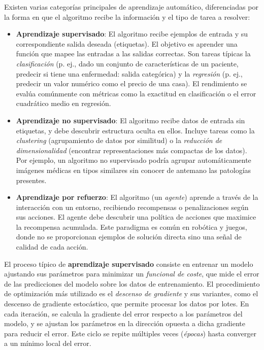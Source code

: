 \documentclass[11pt,spanish,listoffigures,listoftables]{tfgetsinf}
\begin{document}
Existen varias categorías principales de aprendizaje automático, diferenciadas por la forma en que el algoritmo recibe la información 
y el tipo de tarea a resolver:
\begin{itemize}
    \item \textbf{Aprendizaje supervisado}: El algoritmo recibe ejemplos de entrada y su correspondiente salida deseada (etiquetas). 
    El objetivo es aprender una función que mapee las entradas a las salidas correctas. Son tareas típicas la \textit{clasificación} 
    (p. ej., dado un conjunto de características de un paciente, predecir si tiene una enfermedad: salida categórica) y la 
    \textit{regresión} (p. ej., predecir un valor numérico como el precio de una casa). El rendimiento se evalúa comúnmente con métricas
    como la exactitud en clasificación o el error cuadrático medio en regresión.

    \item \textbf{Aprendizaje no supervisado}: El algoritmo recibe datos de entrada sin etiquetas, y debe descubrir estructura oculta en 
    ellos. Incluye tareas como la \textit{clustering} (agrupamiento de datos por similitud) o la \textit{reducción de dimensionalidad} 
    (encontrar representaciones más compactas de los datos). Por ejemplo, un algoritmo no supervisado podría agrupar automáticamente 
    imágenes médicas en tipos similares sin conocer de antemano las patologías presentes.
    
    \item \textbf{Aprendizaje por refuerzo}: El algoritmo (un \textit{agente}) aprende a través de la interacción con un entorno, 
    recibiendo recompensas o penalizaciones según sus acciones. El agente debe descubrir una política de acciones que maximice la 
    recompensa acumulada. Este paradigma es común en robótica y juegos, donde no se proporcionan ejemplos de solución directa sino una 
    señal de calidad de cada acción.
    
\end{itemize}

El proceso típico de \textbf{aprendizaje supervisado} consiste en entrenar un modelo ajustando sus parámetros para minimizar un 
\textit{funcional de coste}, que mide el error de las predicciones del modelo sobre los datos de entrenamiento. El procedimiento de 
optimización más utilizado es el \textit{descenso de gradiente} y sus variantes, como el descenso de gradiente estocástico, que permite 
procesar los datos por lotes. En cada iteración, se calcula la gradiente del error respecto a los parámetros del modelo, y se ajustan los 
parámetros en la dirección opuesta a dicha gradiente para reducir el error. Este ciclo se repite múltiples veces (\textit{épocas}) 
hasta converger a un mínimo local del error.
\end{document}
